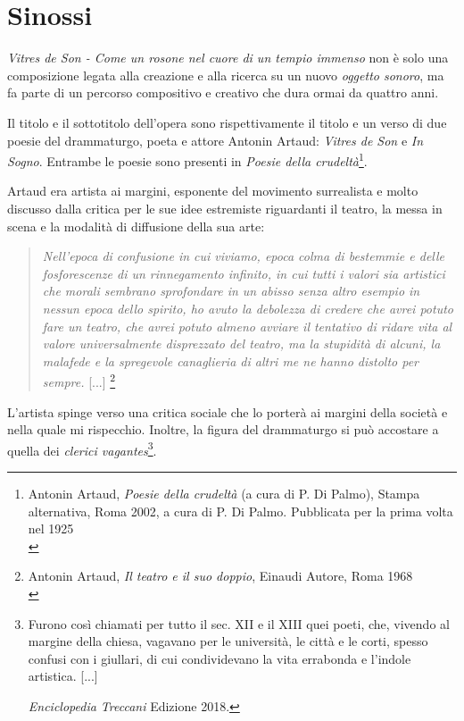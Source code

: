 
\chapter{Sinossi}
\label{chp:Sinossi}

\textit{Vitres de Son - Come un rosone nel cuore di un tempio immenso} non è solo una composizione legata alla creazione e alla ricerca su un nuovo \textit{oggetto sonoro}, ma fa parte di un percorso compositivo e creativo che dura ormai da quattro anni.

Il titolo e il sottotitolo dell'opera sono rispettivamente il titolo e un verso di due poesie del drammaturgo, poeta e attore Antonin Artaud: \textit{Vitres de Son} e \textit{In Sogno}. Entrambe le poesie sono presenti in \textit{Poesie della crudeltà}\footnote{Antonin Artaud, \textit{Poesie della crudeltà} (a cura di P. Di Palmo), Stampa alternativa, Roma 2002, a cura di P. Di Palmo. Pubblicata per la prima volta nel 1925 \\}.

Artaud era artista ai margini, esponente del movimento surrealista e molto discusso dalla critica per le sue idee estremiste riguardanti il teatro, la messa in scena  e la modalità di diffusione della sua arte:

\begin{small}
\begin{quotation}
\textit{Nell'epoca di confusione in cui viviamo, epoca colma di bestemmie e delle fosforescenze di un rinnegamento infinito, in cui tutti i valori sia artistici che morali sembrano sprofondare in un abisso senza altro esempio in nessun epoca dello spirito, ho avuto la debolezza di credere che avrei potuto fare un teatro, che avrei potuto almeno avviare il tentativo di ridare vita al valore universalmente disprezzato del teatro, ma la stupidità di alcuni, la malafede e la spregevole canaglieria di altri me ne hanno distolto per sempre. } [...] \footnote{Antonin Artaud, \textit{Il teatro e il suo doppio}, Einaudi Autore, Roma 1968 \\}
\end{quotation}
\end{small}

L'artista spinge verso una critica sociale che lo porterà ai margini della società e nella quale mi rispecchio. Inoltre, la figura del drammaturgo si può accostare a quella dei \textit{clerici vagantes}\footnote{Furono così chiamati per tutto il sec. XII e il XIII quei poeti, che, vivendo al margine della chiesa, vagavano per le università, le città e le corti, spesso confusi con i giullari, di cui condividevano la vita errabonda e l'indole artistica. [...]

\textit{Enciclopedia Treccani} Edizione 2018.}.

